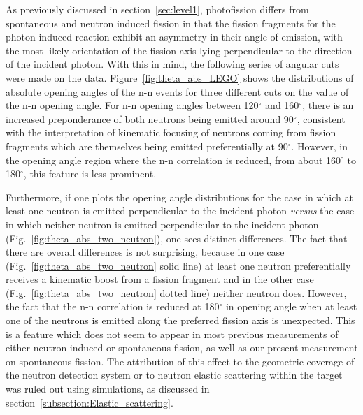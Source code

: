 As previously discussed in section~\ref{sec:level1}, photofission differs from spontaneous and neutron induced fission in that the fission fragments for the photon-induced reaction exhibit an asymmetry in their angle of emission, with the most likely orientation of the fission axis lying perpendicular to the direction of the incident photon.
With this in mind, the following series of angular cuts were made on the data.
Figure~\ref{fig:theta_abs_LEGO} shows the distributions of absolute opening angles of the n-n events for three different cuts on the value of the n-n opening angle.
For n-n opening angles between 120$^{\circ}$ and 160$^{\circ}$, there is an increased preponderance of both neutrons being emitted around 90$^{\circ}$, consistent with the interpretation of kinematic focusing of neutrons coming from fission fragments which are themselves being emitted preferentially at 90$^{\circ}$.
However, in the opening angle region where the n-n correlation is reduced, from about 160$^{\circ}$ to 180$^{\circ}$, this feature is less prominent.

Furthermore, if one plots the opening angle distributions for the case in which at least one neutron is emitted perpendicular to the incident photon \textit{versus} the case in which neither neutron is emitted perpendicular to the incident photon (Fig.~\ref{fig:theta_abs_two_neutron}), one sees distinct differences.
The fact that there are overall differences is not surprising, because in one case (Fig.~\ref{fig:theta_abs_two_neutron} solid line) at least one neutron preferentially receives a kinematic boost from a fission fragment and in the other case (Fig.~\ref{fig:theta_abs_two_neutron} dotted line) neither neutron does.
However, the fact that the n-n correlation is reduced at 180$^{\circ}$ in opening angle when at least one of the neutrons is emitted along the preferred fission axis is unexpected.
This is a feature which does not seem to appear in most previous measurements of either neutron-induced or spontaneous fission, as well as our present measurement on spontaneous fission.
The attribution of this effect to the geometric coverage of the neutron detection system or to neutron elastic scattering within the target was ruled out using simulations, as discussed in section~\ref{subsection:Elastic_scattering}.

